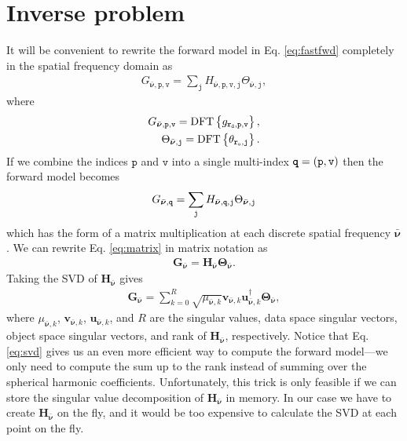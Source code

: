 \documentclass[11pt]{article}
\providecommand{\mb}[1]{\mathbf{#1}}
\providecommand{\bs}[1]{\boldsymbol{#1}}
\providecommand{\tb}[1]{\textbf{#1}}
\providecommand{\ttt}[1]{\texttt{#1}}
\begin{document}
\section{Inverse problem} \label{sec:inv} It will be convenient to rewrite the
forward model in Eq. \ref{eq:fastfwd} completely in the spatial frequency domain
as
\begin{align}
  G_{\bar{\bs{\nu}},\ttt{p},\ttt{v}} = \sum_{\ttt{j}}H_{\bar{\bs{\nu}},\ttt{p},\ttt{v},\ttt{j}}\Theta_{\bar{\bs{\nu}},\ttt{j}}, 
\end{align}
where
\begin{align}
  G_{\bar{\bs{\nu}},\ttt{p},\ttt{v}} = \text{DFT}\left\{g_{\tb{\ttt{r}}_{\ttt{d}},\ttt{p},\ttt{v}}\right\},\\
    \Theta_{\bar{\bs{\nu}},\ttt{j}} = \text{DFT}\left\{\theta_{\tb{\ttt{r}}_{\ttt{o}},\ttt{j}}\right\}.
\end{align}
If we combine the indices $\ttt{p}$ and $\ttt{v}$ into a single multi-index $\ttt{\tb{q}} = (\ttt{p}, \ttt{v})$ then the forward model becomes
\begin{align}
  G_{\bar{\bs{\nu}},\ttt{\tb{q}}} = \sum_{\ttt{j}}H_{\bar{\bs{\nu}},\ttt{\tb{q}},\ttt{j}}\Theta_{\bar{\bs{\nu}},\ttt{j}} \label{eq:matrix}
\end{align}
which has the form of a matrix multiplication at each discrete spatial frequency
$\bar{\bs{\nu}}$. We can rewrite Eq. \ref{eq:matrix} in matrix notation as
\begin{align}
  \mb{G}_{\bar{\bs{\nu}}} = \mb{H}_{\bar{\bs{\nu}}}\bs{\Theta}_{\bar{\bs{\nu}}}.  \label{eq:matrix2}
\end{align}
Taking the SVD of $\mb{H}_{\bar{\bs{\nu}}}$ gives
\begin{align}
  \mb{G}_{\bar{\bs{\nu}}} = \sum_{k=0}^R \sqrt{\mu_{\bar{\bs{\nu}}, k}}\textbf{v}_{\bar{\bs{\nu}}, k}\textbf{u}_{\bar{\bs{\nu}}, k}^{\dagger}\bs{\Theta}_{\bar{\bs{\nu}}}, \label{eq:svd}
\end{align}
where $\mu_{\bar{\bs{\nu}}, k}$, $\textbf{v}_{\bar{\bs{\nu}}, k}$,
$\textbf{u}_{\bar{\bs{\nu}}, k}$, and $R$ are the singular values, data space
singular vectors, object space singular vectors, and rank of
$\mb{H}_{\bar{\bs{\nu}}}$, respectively. Notice that Eq. \ref{eq:svd} gives us
an even more efficient way to compute the forward model---we only need to
compute the sum up to the rank instead of summing over the spherical harmonic
coefficients. Unfortunately, this trick is only feasible if we can store the
singular value decomposition of $\mb{H}_{\bar{\bs{\nu}}}$ in memory. In our case
we have to create $\mb{H}_{\bar{\bs{\nu}}}$ on the fly, and it would be too
expensive to calculate the SVD at each point on the fly.
\end{document}
